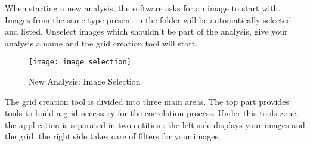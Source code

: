\indent\indent When starting a new analysis, the software asks for an image to start with. Images from the same type present in the folder will be automatically selected and listed. Unselect images which shouldn't be part of the analysis, give your analysis a name and the grid creation tool will start.\\

\begin{figure}[!h]
   \centering
   \texttt{[image: image\_selection]}
   \caption{New Analysis: Image Selection}
\end{figure}

\newline
\indent\indent The grid creation tool is divided into three main areas. The top part provides tools to build a grid necessary for the correlation process. Under this tools zone, the application is separated in two entities : the left side displays your images and the grid, the right side takes care of filters for your images.\\
\newpage
